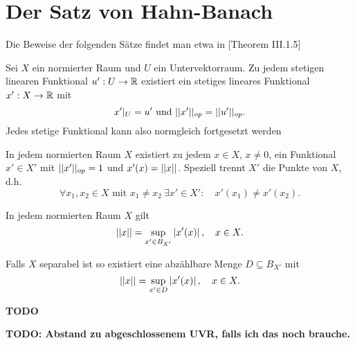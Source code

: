 \section{Der Satz von Hahn-Banach}
Die Beweise der folgenden Sätze findet man etwa in \cite{werner}[Theorem III.1.5]
\begin{theorem}
    Sei $X$ ein normierter Raum und $U$ ein Untervektorraum. 
    Zu jedem stetigen linearen Funktional $u':U \to \mathbb{R}$ existiert ein stetiges lineares Funktional $x':X \to \mathbb{R}$ mit 
    $$
        x'|_U = u' \text{ und } \lvert\lvert x' \rvert\rvert_{op} = \lvert\lvert u' \rvert\rvert_{op}.
    $$
    Jedes stetige Funktional kann also normgleich fortgesetzt werden
\end{theorem}

\begin{corollary}
    In jedem normierten Raum $X$ existiert zu jedem $x \in X$, $x \neq 0$, ein Funktional $x' \in X'$ mit $\lvert\lvert x' \rvert\rvert_{op} = 1$ und $x'(x) = \lvert\lvert x \rvert\rvert$. 
    Speziell trennt $X'$  die Punkte von $X$, d.h.
    $$
        \forall x_1, x_2 \in X \text{ mit } x_1 \neq x_2 \ \exists x' \in X': \quad x'(x_1) \neq x'(x_2). 
    $$
\end{corollary}

\begin{corollary}
    In jedem normierten Raum $X$ gilt 
    $$
        \lvert\lvert x \rvert\rvert = \sup_{x' \in B_{X'}}\left| x'(x) \right|, \quad x \in X. 
    $$
\end{corollary}

\begin{corollary}
    Falls $X$ separabel ist so existiert eine abzählbare Menge $D \subseteq B_{X'}$ mit 
    $$
        \lvert\lvert x \rvert\rvert = \sup_{x' \in D}\left| x'(x) \right|, \quad x \in X. 
    $$
\end{corollary}

\begin{proof*}
    \textbf{TODO}
\end{proof*}

\textbf{TODO: Abstand zu abgeschlossenem UVR, falls ich das noch brauche.}